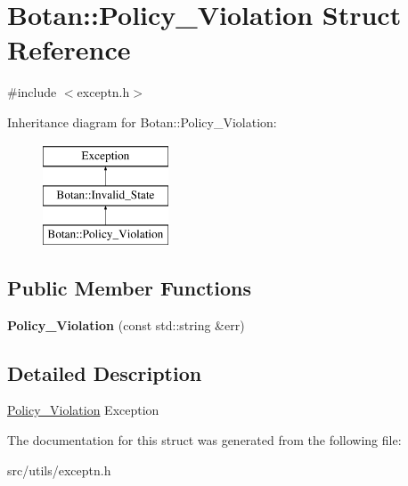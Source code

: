 \hypertarget{structBotan_1_1Policy__Violation}{\section{Botan\-:\-:Policy\-\_\-\-Violation Struct Reference}
\label{structBotan_1_1Policy__Violation}
}


{\ttfamily \#include $<$exceptn.\-h$>$}

Inheritance diagram for Botan\-:\-:Policy\-\_\-\-Violation\-:\begin{figure}[H]
\begin{center}
\leavevmode
\includegraphics[height=3.000000cm]{structBotan_1_1Policy__Violation}
\end{center}
\end{figure}
\subsection*{Public Member Functions}
\begin{DoxyCompactItemize}
\item 
\hypertarget{structBotan_1_1Policy__Violation_a1abc89957f7270d0bbc5afbbf0c64ce7}{{\bfseries Policy\-\_\-\-Violation} (const std\-::string \&err)}\label{structBotan_1_1Policy__Violation_a1abc89957f7270d0bbc5afbbf0c64ce7}

\end{DoxyCompactItemize}


\subsection{Detailed Description}
\hyperlink{structBotan_1_1Policy__Violation}{Policy\-\_\-\-Violation} Exception 

The documentation for this struct was generated from the following file\-:\begin{DoxyCompactItemize}
\item 
src/utils/exceptn.\-h\end{DoxyCompactItemize}
